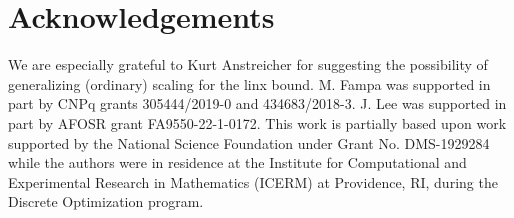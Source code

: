 \documentclass[smallextended]{svjour3hack}       %
\newtheorem{lem}[thm]{Lemma}{\bf}{\rm}
\newtheorem{defn}[thm]{Definition}{\bf}{\rm}
\DeclareMathOperator{\Diag}{Diag}
\begin{document}
{{\section*{Acknowledgements}
We are especially grateful to Kurt Anstreicher for suggesting the possibility of generalizing (ordinary) scaling for the linx bound.
M. Fampa was supported in part by CNPq grants 305444/2019-0 and 434683/2018-3.  J. Lee was supported in part by AFOSR grant FA9550-22-1-0172. This work is partially based upon work supported by the
National Science Foundation under Grant No. DMS-1929284 while
the authors were in residence at the Institute for Computational and Experimental Research in
Mathematics (ICERM) at Providence, RI, during the Discrete Optimization program.





\FloatBarrier














}}
\end{document}
